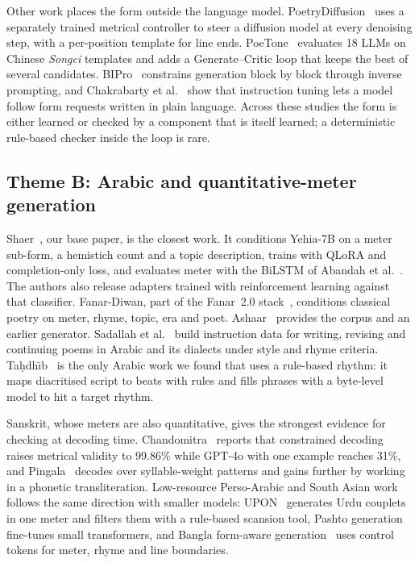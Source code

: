Other work places the form outside the language model. PoetryDiffusion~\cite{hu2024poetrydiffusion} uses a separately
trained metrical controller to steer a diffusion model at every denoising step, with a per-position template for line
ends. PoeTone~\cite{qu2025poetone} evaluates 18 LLMs on Chinese \emph{Songci} templates and adds a Generate--Critic loop
that keeps the best of several candidates. BIPro~\cite{zou2025bipro} constrains generation block by block through
inverse prompting, and Chakrabarty et al.~\cite{chakrabarty2022helpme} show that instruction tuning lets a model
follow form requests written in plain language. Across these studies the form is either learned or checked by a
component that is itself learned; a deterministic rule-based checker inside the loop is rare.

\subsection{Theme B: Arabic and quantitative-meter generation}
Shaer~\cite{abbas2026shaer}, our base paper, is the closest work. It conditions Yehia-7B on a meter sub-form, a
hemistich count and a topic description, trains with QLoRA and completion-only loss, and evaluates meter with the
BiLSTM of Abandah et al.~\cite{abandah2022classifying}. The authors also release adapters trained with reinforcement
learning against that classifier. Fanar-Diwan, part of the Fanar~2.0 stack~\cite{fanar2026fanar2}, conditions classical
poetry on meter, rhyme, topic, era and poet. Ashaar~\cite{alyafeai2023ashaar} provides the corpus and an earlier
generator. Sadallah et al.~\cite{sadallah2026instructpoet} build instruction data for writing, revising and continuing
poems in Arabic and its dialects under style and rhyme criteria. Ta\d{h}dh\={\i}b~\cite{elzohbi2025tahdib} is the
only Arabic work we found that uses a rule-based rhythm: it maps diacritised script to beats with rules and fills
phrases with a byte-level model to hit a target rhythm.

Sanskrit, whose meters are also quantitative, gives the strongest evidence for checking at decoding time.
Chandomitra~\cite{jagadeeshan2026chandomitra} reports that constrained decoding raises metrical validity to 99.86\%
while GPT-4o with one example reaches 31\%, and Pingala~\cite{jagadeeshan2026pingala} decodes over syllable-weight
patterns and gains further by working in a phonetic transliteration. Low-resource Perso-Arabic and South Asian work
follows the same direction with smaller models: UPON~\cite{tabassam2025upon} generates Urdu couplets in one meter and
filters them with a rule-based scansion tool, Pashto generation~\cite{ullah2024pashto} fine-tunes small transformers,
and Bangla form-aware generation~\cite{amina2025bangla} uses control tokens for meter, rhyme and line boundaries.

